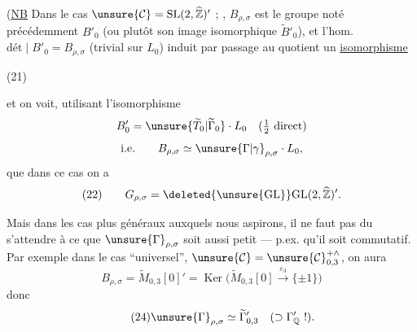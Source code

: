 (\uline{NB} Dans le cas $\unsure{\mathcal{C}}=\mathrm{SL}(2,\widehat{\mathbb Z})'$ ;  , $B_{\rho,\sigma}$  est le groupe noté précédemment $B'_0$ (ou plutôt son image isomorphique $\widetilde B'_0$), et l'hom. $\mathrm{dét}\mid B'_0=B_{\rho,\sigma}$  (trivial sur $L_0$) induit par passage au quotient un \uline{isomorphisme}
\begin{samepage}
\hfill(21)
\end{samepage}
et on voit,  utilisant l'isomorphisme
\[
B'_0=\unsure{\widetilde T_0|\widetilde\Gamma_0}\cdot L_0\quad(\tfrac12\text{ direct})
\]
\[
\text{i.e.}\qquad B_{\rho,\sigma}\simeq\unsure{\Gamma|\gamma}_{\rho,\sigma}\cdot L_0,
\]
que dans ce cas on a
\[
(22)\qquad G_{\rho,\sigma}=\deleted{\unsure{\mathrm{GL}}}\mathrm{GL}(2,\widehat{\mathbb Z})'.
\]


Mais dans les cas plus généraux auxquels nous aspirons, il ne faut pas du  s'attendre à ce que $\unsure{\Gamma}_{\rho,\sigma}$ soit aussi petit --- p.ex. qu'il soit commutatif.
Par exemple dans le cas ``universel'', $\unsure{\mathcal{C}}=\unsure{\mathcal{C}}_{0,3}^{+\wedge}$, on aura
\[
\tag{23}
B_{\rho,\sigma}=\widetilde{M}_{0,3}[0]'=
\operatorname{Ker}\bigl(\widetilde{M}_{0,3}[0]\xrightarrow{\varepsilon_3}\{\pm1\}\bigr)
\]
donc
\[
\tag{24}
\unsure{\Gamma}_{\rho,\sigma}\simeq\widetilde{\Gamma}_{0,3}'
\quad(\supset\Gamma_{\mathbb{Q}}'\ !).
\]

